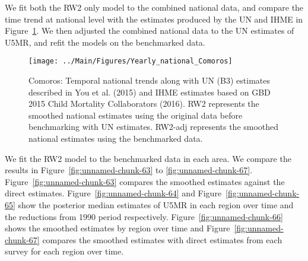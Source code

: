 \documentclass[12pt]{article}\usepackage[]{graphicx}\usepackage[]{color}
\newenvironment{knitrout}{}{} %
\begin{document}
We fit both the RW2 only model to the combined national data, and compare the time trend at national level with the estimates produced by the UN and IHME in Figure~\ref{fig:unnamed-chunk-62}. We then adjusted the combined national data to the UN estimates of U5MR, and refit the models on the benchmarked data. 

\begin{knitrout}
\color{fgcolor}\begin{figure}[bht]

{\centering \texttt{[image: ../Main/Figures/Yearly\_national\_Comoros]} 

}

\caption[Comoros]{Comoros: Temporal national trends along with UN (B3) estimates described in You et al. (2015) and IHME estimates based on GBD 2015 Child Mortality Collaborators (2016). RW2 represents the smoothed national estimates using the original data before benchmarking with UN estimates. RW2-adj represents the smoothed national estimates using the benchmarked data.}\label{fig:unnamed-chunk-62}
\end{figure}


\end{knitrout}
 

We fit the RW2 model to the benchmarked data in each area. 
We compare the results in Figure~\ref{fig:unnamed-chunk-63} to \ref{fig:unnamed-chunk-67}.
Figure~\ref{fig:unnamed-chunk-63} compares the smoothed estimates against the direct estimates. Figure~\ref{fig:unnamed-chunk-64} and Figure~\ref{fig:unnamed-chunk-65} show the posterior median estimates of U5MR in each region over time and the reductions from 1990 period respectively.
Figure~\ref{fig:unnamed-chunk-66} shows the smoothed estimates by region over time and Figure~\ref{fig:unnamed-chunk-67} compares the smoothed estimates with direct estimates from each survey for each region over time.




\end{document}
